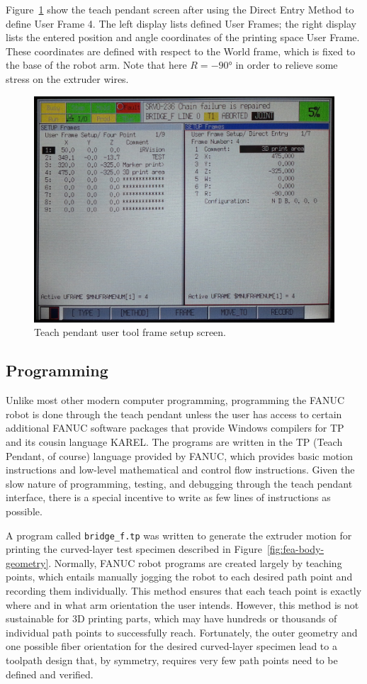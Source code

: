 Figure~\ref{fig:uframe} show the teach pendant screen after using the Direct Entry Method to define User Frame 4. The left display lists defined User Frames; the right display lists the entered position and angle coordinates of the printing space User Frame. These coordinates are defined with respect to the World frame, which is fixed to the base of the robot arm. Note that here \(R=-90\si{\degree}\) in order to relieve some stress on the extruder wires.

\begin{figure}
    \centering
    \includegraphics[width=.8\linewidth]{figures/tp-screens/uframe}
    \caption{Teach pendant user tool frame setup screen.}
    \label{fig:uframe}
\end{figure}

\subsection{Programming}
Unlike most other modern computer programming, programming the FANUC robot is done through the teach pendant unless the user has access to certain additional FANUC software packages that provide Windows compilers for TP and its cousin language KAREL. The programs are written in the TP (Teach Pendant, of course) language provided by FANUC, which provides basic motion instructions and low-level mathematical and control flow instructions. Given the slow nature of programming, testing, and debugging through the teach pendant interface, there is a special incentive to write as few lines of instructions as possible. 

A program called \verb|bridge_f.tp| was written to generate the extruder motion for printing the curved-layer test specimen described in Figure~\ref{fig:fea-body-geometry}. Normally, FANUC robot programs are created largely by teaching points, which entails manually jogging the robot to each desired path point and recording them individually. This method ensures that each teach point is exactly where and in what arm orientation the user intends. However, this method is not sustainable for 3D printing parts, which may have hundreds or thousands of individual path points to successfully reach. Fortunately, the outer geometry and one possible fiber orientation for the desired curved-layer specimen lead to a toolpath design that, by symmetry, requires very few path points need to be defined and verified. 

